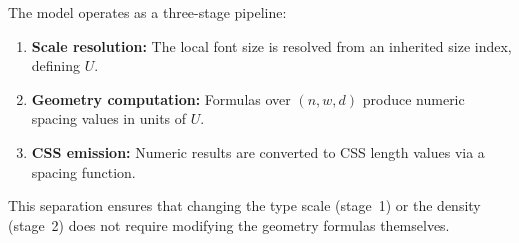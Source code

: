 The model operates as a three-stage pipeline:

\begin{enumerate}
  \item \textbf{Scale resolution:} The local font size is resolved from an inherited size index, defining $U$.
  \item \textbf{Geometry computation:} Formulas over $(n, w, d)$ produce numeric spacing values in units of $U$.
  \item \textbf{CSS emission:} Numeric results are converted to CSS length values via a spacing function.
\end{enumerate}

This separation ensures that changing the type scale (stage~1) or the density (stage~2) does not require modifying the geometry formulas themselves.
